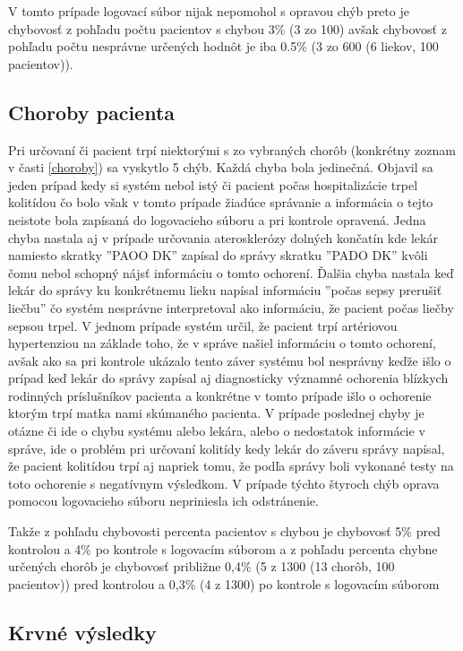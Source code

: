 V tomto prípade logovací súbor nijak nepomohol s opravou chýb preto je chybovosť z pohľadu počtu pacientov s chybou 3\% (3 zo 100) avšak chybovosť z pohľadu počtu nesprávne určených hodnôt je iba 0.5\% (3 zo 600 (6 liekov, 100 pacientov)).

\subsection{Choroby pacienta}

Pri určovaní či pacient trpí niektorými s zo vybraných chorôb (konkrétny zoznam v časti \ref{choroby}) sa vyskytlo 5 chýb. Každá chyba bola jedinečná. Objavil sa jeden prípad kedy si systém nebol istý či pacient počas hospitalizácie trpel kolitídou čo bolo však v tomto prípade žiadúce správanie a informácia o tejto neistote bola zapísaná do logovacieho súboru a pri kontrole opravená. Jedna chyba nastala aj v prípade určovania aterosklerózy dolných končatín kde lekár namiesto skratky ''PAOO DK'' zapísal do správy skratku  ''PADO DK'' kvôli čomu nebol schopný nájsť informáciu o tomto ochorení. Ďalšia chyba nastala keď lekár do správy ku konkrétnemu lieku napísal informáciu ''počas sepsy prerušiť liečbu'' čo systém nesprávne interpretoval ako informáciu, že pacient počas liečby sepsou trpel. V jednom prípade systém určil, že pacient trpí artériovou hypertenziou na základe toho, že v správe našiel informáciu o tomto ochorení, avšak ako sa pri kontrole ukázalo tento záver systému bol nesprávny keďže išlo o prípad keď lekár do správy zapísal aj diagnosticky významné ochorenia blízkych rodinných príslušníkov pacienta a konkrétne v tomto prípade išlo o ochorenie ktorým trpí matka nami skúmaného pacienta. V prípade poslednej chyby je otázne či ide o chybu systému alebo lekára, alebo o nedostatok informácie v správe, ide o problém pri určovaní kolitídy kedy lekár do záveru správy napísal, že pacient kolitídou trpí aj napriek tomu, že podľa správy boli vykonané testy na toto ochorenie s negatívnym výsledkom. V prípade týchto štyroch chýb oprava pomocou logovacieho súboru nepriniesla ich odstránenie.

Takže z pohľadu chybovosti percenta pacientov s chybou je chybovosť 5\% pred kontrolou a 4\% po kontrole s logovacím súborom a z pohľadu percenta chybne určených chorôb je chybovosť približne 0,4\% (5 z 1300 (13 chorôb, 100 pacientov)) pred kontrolou a 0,3\% (4 z 1300) po kontrole s logovacím súborom

\subsection{Krvné výsledky}

